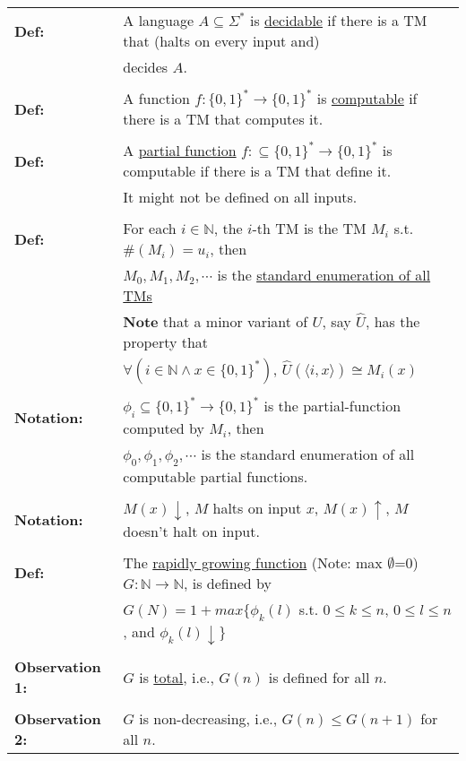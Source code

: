 \documentclass[11pt]{article}
\begin{document}
\begin{longtable}{ll}
{\bf Def:} & A language $A \subseteq\Sigma ^*$ is \underline{decidable} if there is a TM that (halts on every input and) \\
& decides $A$. \\
\\
{\bf Def:} & A function $f:\{0,1\}^*\rightarrow\{0,1\}^*$ is \underline{computable} if there is a TM that computes it. \\
\\
{\bf Def:} & A \underline{partial function} $f:\subseteq\{0,1\}^*\rightarrow\{0,1\}^*$ is computable if there is a TM that define it. \\
& It might not be defined on all inputs. \\
\\
{\bf Def:} & For each $i\in\mathbb{N}$, the $i$-th TM is the TM $M_i$ s.t. $\#(M_i)=u_i$, then \\
& $M_0, M_1, M_2, \cdots$ is the \underline{standard enumeration of all TMs} \\
& $\textbf{Note}$ that a minor variant of $U$, say $\hat{U}$, has the property that \\
& $\forall(i\in\mathbb{N}\wedge x\in\{0,1\}^*)$, $\hat{U}(\langle i,x \rangle)\cong M_i(x)$ \\
\\
{\bf Notation:} & $\phi_i\subseteq\{0,1\}^*\rightarrow\{0,1\}^*$ is the partial-function computed by $M_i$, then \\
& $\phi_0,\phi_1,\phi_2,\cdots$ is the standard enumeration of all computable partial functions. \\
\\
{\bf Notation:} & $M(x)\downarrow$, $M$ halts on input $x$, $M(x)\uparrow$, $M$ doesn't halt on input. \\
\\
{\bf Def:} & The \underline{rapidly growing function} (Note: max $\emptyset$=0) $G:\mathbb{N}\rightarrow\mathbb{N}$, is defined by \\
& $G(N) = 1 + max\{\phi_k(l)$ s.t. $0 \leqslant k \leqslant n$, $0 \leqslant l \leqslant n$, and $\phi_k(l)\downarrow\}$ \\
\\
{\bf Observation 1:} & $G$ is \underline{total}, i.e., $G(n)$ is defined for all $n$. \\
\\
{\bf Observation 2:} & $G$ is non-decreasing, i.e., $G(n) \leqslant G(n+1)$ for all $n$. \\

\end{longtable}
\end{document}
